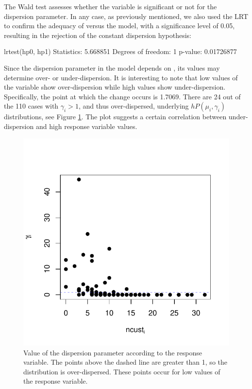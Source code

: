 The Wald test assesses whether the  variable is significant or not for the dispersion parameter. In any case, as previously mentioned, we also used the LRT to confirm the adequacy of  versus the  model, with a significance level of 0.05, resulting in the rejection of the constant dispersion hypothesis:

\begin{example}
lrtest(hp0, hp1)
Statistics: 5.668851
Degrees of freedom: 1
p-value: 0.01726877
\end{example}

Since the dispersion parameter in the  model depends on , its values may determine over- or under-dispersion. It is interesting to note that low values of the  variable show over-dispersion while  high values show under-dispersion. Specifically, the point at which the change occurs is 1.7069. There are  24 out of the 110 cases with $\gamma_i > 1$, and thus over-dispersed, underlying $hP(\mu_i, \gamma_i)$ distributions, see  Figure \ref{fig:dispersion}. The plot suggests a certain correlation between under-dispersion and high response variable values.

\begin{figure}[h]
	\centering
	\includegraphics[scale=0.6]{dispersion.pdf}
	\caption{Value of the dispersion parameter according to the response variable. The points above the dashed line are greater than 1, so the distribution is over-dispersed. These points occur for low values of the response variable.}
	\label{fig:dispersion}
\end{figure}

